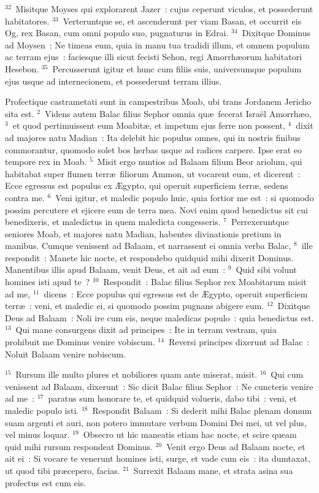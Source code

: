 ${}^{32}$~Misitque Moyses qui explorarent Jazer~: cujus ceperunt viculos, et possederunt habitatores.
${}^{33}$~Verteruntque se, et ascenderunt per viam Basan, et occurrit eis Og, rex Basan, cum omni populo suo, pugnaturus in Edrai.
${}^{34}$~Dixitque Dominus ad Moysen~: Ne timeas eum, quia in manu tua tradidi illum, et omnem populum ac terram ejus~: faciesque illi sicut fecisti Sehon, regi Amorrh\ae orum habitatori Hesebon.
${}^{35}$~Percusserunt igitur et hunc cum filiis suis, universumque populum ejus usque ad internecionem, et possederunt terram illius.

\lettrine[lines=3,image=true,loversize=0.05,lraise=-0.03]{P}{}rofectique castrametati sunt in campestribus Moab, ubi trans Jordanem Jericho sita est.
${}^{2}$~Videns autem Balac filius Sephor omnia qu\ae\ fecerat Isra\"el Amorrh\ae o,
${}^{3}$~et quod pertimuissent eum Moabit\ae , et impetum ejus ferre non possent,
${}^{4}$~dixit ad majores natu Madian~: Ita delebit hic populus omnes, qui in nostris finibus commorantur, quomodo solet bos herbas usque ad radices carpere. Ipse erat eo tempore rex in Moab.
${}^{5}$~Misit ergo nuntios ad Balaam filium Beor ariolum, qui habitabat super flumen terr\ae\ filiorum Ammon, ut vocarent eum, et dicerent~: Ecce egressus est populus ex \AE gypto, qui operuit superficiem terr\ae , sedens contra me.
${}^{6}$~Veni igitur, et maledic populo huic, quia fortior me est~: si quomodo possim percutere et ejicere eum de terra mea. Novi enim quod benedictus sit cui benedixeris, et maledictus in quem maledicta congesseris.
${}^{7}$~Perrexeruntque seniores Moab, et majores natu Madian, habentes divinationis pretium in manibus. Cumque venissent ad Balaam, et narrassent ei omnia verba Balac,
${}^{8}$~ille respondit~: Manete hic nocte, et respondebo quidquid mihi dixerit Dominus. Manentibus illis apud Balaam, venit Deus, et ait ad eum~:
${}^{9}$~Quid sibi volunt homines isti apud te~?
${}^{10}$~Respondit~: Balac filius Sephor rex Moabitarum misit ad me,
${}^{11}$~dicens~: Ecce populus qui egressus est de \AE gypto, operuit superficiem terr\ae~: veni, et maledic ei, si quomodo possim pugnans abigere eum.
${}^{12}$~Dixitque Deus ad Balaam~: Noli ire cum eis, neque maledicas populo~: quia benedictus est.
${}^{13}$~Qui mane consurgens dixit ad principes~: Ite in terram vestram, quia prohibuit me Dominus venire vobiscum.
${}^{14}$~Reversi principes dixerunt ad Balac~: Noluit Balaam venire nobiscum.


${}^{15}$~Rursum ille multo plures et nobiliores quam ante miserat, misit.
${}^{16}$~Qui cum venissent ad Balaam, dixerunt~: Sic dicit Balac filius Sephor~: Ne cuncteris venire ad me~:
${}^{17}$~paratus sum honorare te, et quidquid volueris, dabo tibi~: veni, et maledic populo isti.
${}^{18}$~Respondit Balaam~: Si dederit mihi Balac plenam domum suam argenti et auri, non potero immutare verbum Domini Dei mei, ut vel plus, vel minus loquar.
${}^{19}$~Obsecro ut hic maneatis etiam hac nocte, et scire queam quid mihi rursum respondeat Dominus.
${}^{20}$~Venit ergo Deus ad Balaam nocte, et ait ei~: Si vocare te venerunt homines isti, surge, et vade cum eis~: ita dumtaxat, ut quod tibi pr\ae cepero, facias.
${}^{21}$~Surrexit Balaam mane, et strata asina sua profectus est cum eis.


